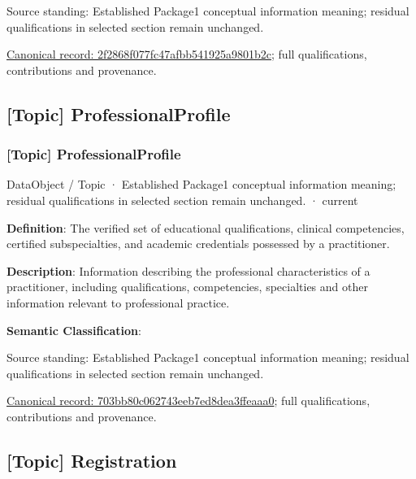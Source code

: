 Source standing: Established Package1 conceptual information meaning; residual qualifications in selected section remain unchanged.


{\footnotesize \href{../../../../continuum/application/data-object/topic/2f2868f077fc47afbb541925a9801b2c.md}{Canonical record: 2f2868f077fc47afbb541925a9801b2c}; full qualifications, contributions and provenance.}\par
\subsection{[Topic] ProfessionalProfile}

\subsubsection{[Topic] ProfessionalProfile}

\label{element:703bb80c062743eeb7ed8dea3ffeaaa0}
{\small DataObject / Topic · Established Package1 conceptual information meaning; residual qualifications in selected section remain unchanged. · current}\par

\textbf{Definition}: The verified set of educational qualifications, clinical competencies, certified subspecialties, and academic credentials possessed by a practitioner.



\textbf{Description}: Information describing the professional characteristics of a practitioner, including qualifications, competencies, specialties and other information relevant to professional practice.



\textbf{Semantic Classification}: \texttt{}



Source standing: Established Package1 conceptual information meaning; residual qualifications in selected section remain unchanged.


{\footnotesize \href{../../../../continuum/application/data-object/topic/703bb80c062743eeb7ed8dea3ffeaaa0.md}{Canonical record: 703bb80c062743eeb7ed8dea3ffeaaa0}; full qualifications, contributions and provenance.}\par
\subsection{[Topic] Registration}


